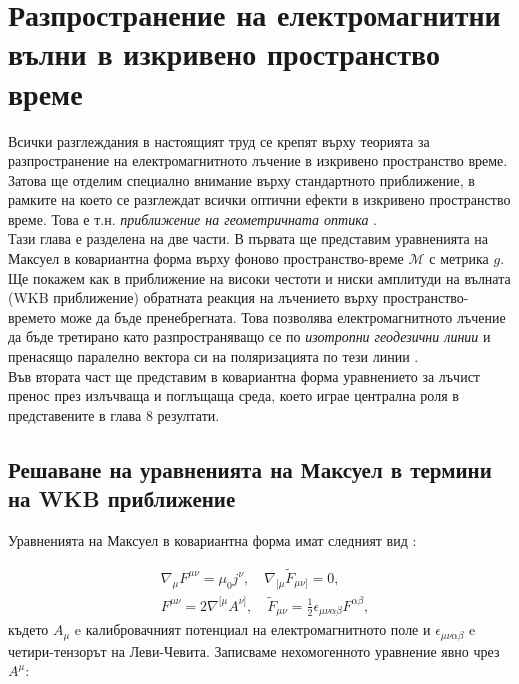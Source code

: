 \section{Разпространение на електромагнитни вълни в изкривено пространство време}

Всички разглеждания в настоящият труд се крепят върху теорията за разпространение на електромагнитното лъчение в изкривено пространство време. Затова ще отделим специално внимание върху стандартното приближение, в рамките на което се разглеждат всички оптични ефекти в изкривено пространство време. Това е т.н. \emph{приближение на геометричната оптика} \cite{Schneider1992}. \\

Тази глава е разделена на две части. В първата ще представим уравненията на Максуел в ковариантна форма върху фоново пространство-време $\mathcal{M}$ с метрика $g$. Ще покажем как в приближение на високи честоти и ниски амплитуди на вълната (WKB приближение) обратната реакция на лъчението върху пространство-времето може да бъде пренебрегната. Това позволява електромагнитното лъчение да бъде третирано като разпространяващо се по \emph{изотропни геодезични линии} и пренасящо паралелно вектора си на поляризацията по тези линии \cite{Dolan2018}\cite{Oancea2020}.\\

Във втората част ще представим в ковариантна форма уравнението за лъчист пренос през излъчваща и поглъщаща среда, което играе централна роля в представените в глава 8 резултати.

\subsection{Решаване на уравненията на Максуел в термини на WKB приближение}

Уравненията на Максуел в ковариантна форма имат следният вид \cite{Weinberg1972}:

\begin{subequations}
	\begin{align}
	&\nabla_\mu F^{\mu\nu} = \mu_0 j^\nu,\quad \nabla_{[\mu}\tilde{F}_{\mu\nu]} = 0,\\
	&F^{\mu\nu} = 2\nabla^{[\mu}A^{\nu]}, \quad \tilde{F}_{\mu\nu} = \frac{1}{2}\epsilon_{\mu\nu\alpha\beta}F^{\alpha\beta},
	\end{align}
\end{subequations}
където $A_\mu$ e калибровачният потенциал на електромагнитното поле и $\epsilon_{\mu\nu\alpha\beta}$ e четири-тензорът на Леви-Чевита. Записваме нехомогенното уравнение явно чрез $A^\mu$:


